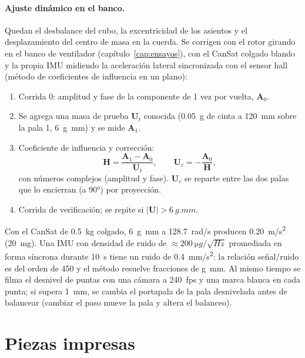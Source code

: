 \paragraph{Ajuste dinámico en el banco.} Quedan el desbalance del cubo, la excentricidad
de los asientos y el desplazamiento del centro de masa en la cuerda. Se corrigen con el
rotor girando en el banco de ventilador (capítulo~\ref{cap:ensayos}), con el CanSat
colgado blando y la propia IMU midiendo la aceleración lateral sincronizada con el sensor
hall (método de coeficientes de influencia en un plano):
\begin{enumerate}
  \item Corrida 0: amplitud y fase de la componente de 1 vez por vuelta, $\mathbf A_0$.
  \item Se agrega una masa de prueba $\mathbf U_t$ conocida (\SI{0.05}{g} de cinta a
        \SI{120}{mm} sobre la pala 1, \SI{6}{g.mm}) y se mide $\mathbf A_1$.
  \item Coeficiente de influencia y corrección:
        \begin{equation}
          \mathbf H=\frac{\mathbf A_1-\mathbf A_0}{\mathbf U_t},\qquad
          \mathbf U_c=-\frac{\mathbf A_0}{\mathbf H},
          \label{eq:fabricacion-influencia}
        \end{equation}
        con números complejos (amplitud y fase). $\mathbf U_c$ se reparte entre las dos
        palas que lo encierran (a \ang{90}) por proyección.
  \item Corrida de verificación; se repite si $|\mathbf U|>\SI{6}{g.mm}$.
\end{enumerate}
Con el CanSat de \SI{0.5}{kg} colgado, \SI{6}{g.mm} a \SI{128.7}{rad/s} producen
\SI{0.20}{m/s^2} (\SI{20}{mg}). Una IMU con densidad de ruido de
$\approx\SI{200}{\micro g/\sqrt{Hz}}$ promediada en forma síncrona durante \SI{10}{s}
tiene un ruido de \SI{0.4}{mm/s^2}: la relación señal/ruido es del orden de 450 y el
método resuelve fracciones de \si{g.mm}. Al mismo tiempo se filma el desnivel de puntas
con una cámara a \SI{240}{fps} y una marca blanca en cada punta; si supera \SI{1}{mm}, se
cambia el portapala de la pala desnivelada antes de balancear (cambiar el paso mueve la
pala y altera el balanceo).

\section{Piezas impresas}\label{sec:fabricacion-impresion}


